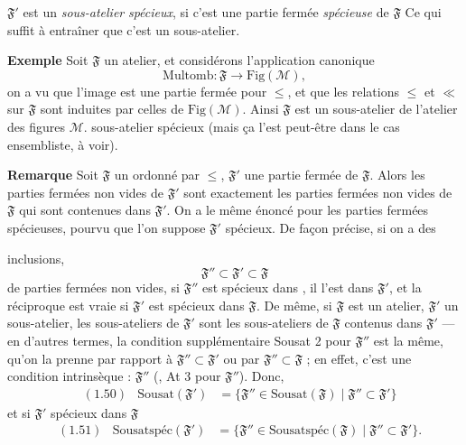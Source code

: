 \documentclass[11pt,a4paper]{article}
\begin{document}
$\mathfrak{F}'$ est un \emph{sous-atelier} \emph{spécieux}, si c'est une partie fermée \emph{spécieuse} de $\mathfrak{F}$  Ce qui suffit à entraîner que c'est un sous-atelier.

\textbf{Exemple} Soit $\mathfrak{F}$ un atelier, et considérons l'application canonique
\[
  \mathrm{Multomb} : \mathfrak{F} \longrightarrow \mathrm{Fig}(\mathcal{M}),
\]
on a vu que l'image est une partie fermée pour $\leq$, et que les relations $\leq$ et $\ll$ sur $\mathfrak{F}$ sont induites par celles de $\mathrm{Fig}(\mathcal{M})$. Ainsi $\mathfrak{F}$ est un sous-atelier de l'atelier des figures   $\mathcal{M}$.   sous-atelier spécieux (mais ça l'est peut-être dans le cas ensembliste, à voir).


\textbf{Remarque} Soit $\mathfrak{F}$ un ordonné par $\leq$, $\mathfrak{F}'$ une partie fermée  de $\mathfrak{F}$. Alors les parties fermées non vides de $\mathfrak{F}'$ sont exactement les parties fermées non vides de $\mathfrak{F}$ qui sont contenues dans $\mathfrak{F}'$. On a le même énoncé pour les parties fermées spécieuses, pourvu que l'on suppose $\mathfrak{F}'$ spécieux. De façon précise, si \ill{} on a des

inclusions,
\[
  \mathfrak{F}'' \subset \mathfrak{F}' \subset \mathfrak{F}
\]
de parties fermées non vides, si $\mathfrak{F}''$ est spécieux dans , il l'est dans $\mathfrak{F}'$, et la réciproque est vraie si $\mathfrak{F}'$ est spécieux dans $\mathfrak{F}$. De même, si $\mathfrak{F}$ est un atelier, $\mathfrak{F}'$ un sous-atelier, les sous-ateliers de $\mathfrak{F}'$ sont les sous-ateliers de $\mathfrak{F}$ contenus dans $\mathfrak{F}'$ --- en d'autres termes, la condition supplémentaire Sousat 2 pour $\mathfrak{F}''$ est la même, qu'on la prenne par rapport à $\mathfrak{F}'' \subset \mathfrak{F}'$ ou par $\mathfrak{F}'' \subset \mathfrak{F}$ ; en effet, c'est une condition intrinsèque : $\mathfrak{F}''$ \ill{} (, At 3 pour $\mathfrak{F}''$). Donc, \struck{\ill{}}
\begin{align*}
  &(1.50) & \mathrm{Sousat}(\mathfrak{F}') &= \lbrace \mathfrak{F}'' \in \mathrm{Sousat}(\mathfrak{F}) \mid \mathfrak{F}'' \subset \mathfrak{F}' \rbrace
\end{align*}
et si $\mathfrak{F}'$ spécieux dans $\mathfrak{F}$
\begin{align*}
  &(1.51) & \text{Sousatspéc}(\mathfrak{F}') &= \lbrace \mathfrak{F}'' \in \text{Sousatspéc}(\mathfrak{F}) \mid \mathfrak{F}'' \subset \mathfrak{F}' \rbrace .
\end{align*}
\end{document}
